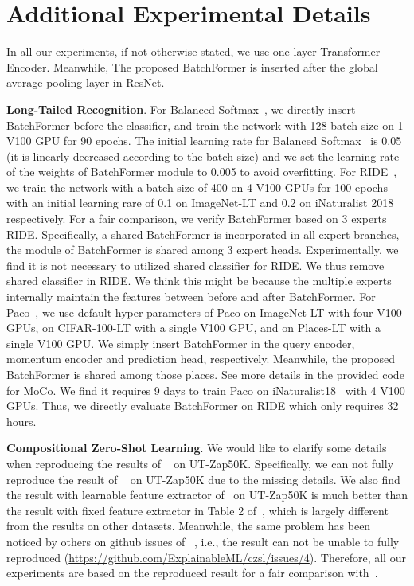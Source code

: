 \documentclass[10pt,twocolumn,letterpaper]{article}
\begin{document}
{\small


}








\appendix
\section{Additional Experimental Details}

In all our experiments, if not otherwise stated, we use one layer Transformer Encoder. Meanwhile, The proposed BatchFormer is inserted after the global average pooling layer in ResNet.

{\bf Long-Tailed Recognition}. For Balanced Softmax~\cite{ren2020balanced}, we directly insert BatchFormer before the classifier, and train the network with 128 batch size on 1 V100 GPU for 90 epochs. The initial learning rate for Balanced Softmax~\cite{ren2020balanced} is 0.05 (it is linearly decreased according to the batch size) and we set the learning rate of the weights of BatchFormer module to 0.005 to avoid overfitting. For RIDE~\cite{wang2020long}, we train the network with a batch size of 400 on 4 V100 GPUs for 100 epochs with an initial learning rare of 0.1 on ImageNet-LT and 0.2 on iNaturalist 2018 respectively. For a fair comparison, we verify BatchFormer based on 3 experts RIDE. Specifically, a shared BatchFormer is incorporated in all expert branches, \ie the module of BatchFormer is shared among 3 expert heads. Experimentally, we find it is not necessary to utilized shared classifier for RIDE. We thus remove shared classifier in RIDE. We think this might be because the multiple experts internally maintain the features between before and after BatchFormer. For Paco~\cite{cui2021parametric}, we use default hyper-parameters of Paco on ImageNet-LT with four V100 GPUs, on CIFAR-100-LT with a single V100 GPU, and on Places-LT with a single V100 GPU. We simply insert BatchFormer in the query encoder, momentum encoder and prediction head, respectively. Meanwhile, the proposed BatchFormer is shared among those places. See more details in the provided code for MoCo. We find it requires 9 days to train Paco on iNaturalist18~\cite{van2018inaturalist} with 4 V100 GPUs. Thus, we directly evaluate BatchFormer on RIDE which only requires 32 hours.


{\bf Compositional Zero-Shot Learning}. We would like to clarify some details when reproducing the results of  ~\cite{naeem2021learning} on UT-Zap50K. Specifically, we can not fully reproduce the result of ~\cite{naeem2021learning} on UT-Zap50K due to the missing details. We also find the result with learnable feature extractor of~\cite{naeem2021learning} on UT-Zap50K is much better than the result with fixed feature extractor in Table 2 of~\cite{naeem2021learning}, which is largely different from the results on other datasets. Meanwhile, the same problem has been noticed by others on github issues of  ~\cite{naeem2021learning}, i.e., the result can not be unable to fully reproduced (\hyperlink{https://github.com/ExplainableML/czsl/issues/4}{https://github.com/ExplainableML/czsl/issues/4}). Therefore, all our experiments are based on the reproduced result for a fair comparison with~\cite{naeem2021learning}.
\end{document}
